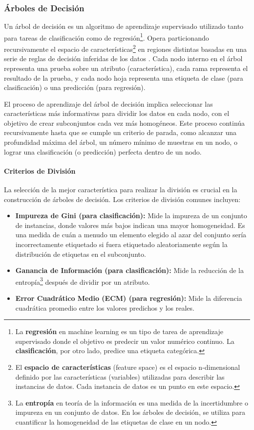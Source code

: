 \subsubsection{Árboles de Decisión}
Un árbol de decisión es un algoritmo de aprendizaje supervisado utilizado tanto para tareas de clasificación como de regresión\footnote{La \textbf{regresión} en machine learning es un tipo de tarea de aprendizaje supervisado donde el objetivo es predecir un valor numérico continuo.
La \textbf{clasificación}, por otro lado, predice una etiqueta categórica.}.
Opera particionando recursivamente el espacio de características\footnote{El \textbf{espacio de características} (feature space) es el espacio n-dimensional definido por las características (variables) utilizadas para describir las instancias de datos.
Cada instancia de datos es un punto en este espacio.} en regiones distintas basadas en una serie de reglas de decisión inferidas de los datos \parencite{quinlan1986induction}.
Cada nodo interno en el árbol representa una prueba sobre un atributo (característica), cada rama representa el resultado de la prueba, y cada nodo hoja representa una etiqueta de clase (para clasificación) o una predicción (para regresión).

El proceso de aprendizaje del árbol de decisión implica seleccionar las características más informativas para dividir los datos en cada nodo, con el objetivo de crear subconjuntos cada vez más homogéneos.
Este proceso continúa recursivamente hasta que se cumple un criterio de parada, como alcanzar una profundidad máxima del árbol, un número mínimo de muestras en un nodo, o lograr una clasificación (o predicción) perfecta dentro de un nodo.

\paragraph{Criterios de División}
La selección de la mejor característica para realizar la división es crucial en la construcción de árboles de decisión.
Los criterios de división comunes incluyen:

\begin{itemize}
    \item \textbf{Impureza de Gini (para clasificación):} Mide la impureza de un conjunto de instancias, donde valores más bajos indican una mayor homogeneidad.
Es una medida de cuán a menudo un elemento elegido al azar del conjunto sería incorrectamente etiquetado si fuera etiquetado aleatoriamente según la distribución de etiquetas en el subconjunto.
    \item \textbf{Ganancia de Información (para clasificación):} Mide la reducción de la entropía\footnote{La \textbf{entropía} en teoría de la información es una medida de la incertidumbre o impureza en un conjunto de datos.
En los árboles de decisión, se utiliza para cuantificar la homogeneidad de las etiquetas de clase en un nodo.} después de dividir por un atributo.
    \item \textbf{Error Cuadrático Medio (ECM) (para regresión):} Mide la diferencia cuadrática promedio entre los valores predichos y los reales.
\end{itemize}
